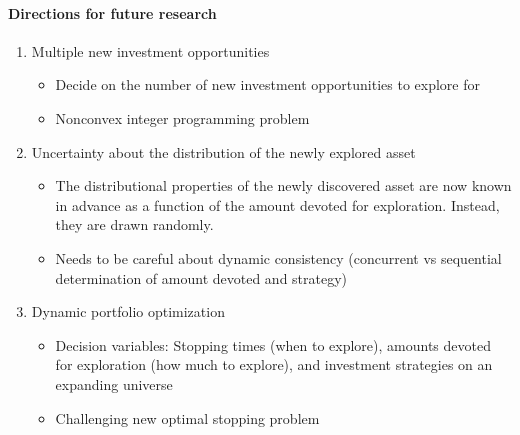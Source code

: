 \paragraph{Directions for future research}
\begin{enumerate}[1)]
    \item Multiple new investment opportunities
        \begin{itemize}
            \item Decide on the number of new investment opportunities to
                explore for
            \item Nonconvex integer programming problem
        \end{itemize}
    \item Uncertainty about the distribution of the newly explored asset
        \begin{itemize}
            \item The distributional properties of the newly discovered asset
                are now known in advance as a function of the amount devoted
                for exploration. Instead, they are drawn randomly.
            \item Needs to be careful about dynamic consistency (concurrent
                vs sequential determination of amount devoted and strategy)
        \end{itemize}
    \item Dynamic portfolio optimization
        \begin{itemize}
            \item Decision variables: Stopping times (when to explore),
                amounts devoted for exploration (how much to explore), and 
                investment strategies on an expanding universe
            \item Challenging new optimal stopping problem
        \end{itemize}
\end{enumerate}
